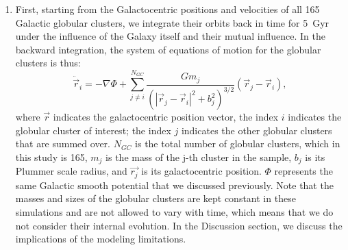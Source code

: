 \documentclass{aa}
\begin{document}
      \begin{enumerate}
          \item First, starting from the Galactocentric positions and velocities of all 165 Galactic globular clusters, we integrate their orbits back in time for 5~Gyr under the influence of the Galaxy itself and their mutual influence. In the backward integration, the system of equations of motion for the globular clusters is thus: 
          \begin{equation}
          \ddot{\vec{r}}_i = -\nabla \Phi + \left.\sum_{j\neq i}^{N_{GC}} \frac{Gm_j}{\left(|\vec{r}_j - \vec{r}_i|^2 + b_j^2\right)^{3/2}}\right. \left(\vec{r}_j - \vec{r}_i\right),
          \end{equation}\label{eq:GCNBody} 
          \noindent where $\vec{r}$ indicates the galactocentric position vector, the index $i$ indicates the globular cluster of interest; the index $j$ indicates the other globular clusters that are summed over. $N_{GC}$ is the total number of globular clusters, which in this study is 165, $m_j$ is the mass of the j-th cluster in the sample, $b_j$ is its Plummer scale radius, and $\vec{r_j}$ is its galactocentric position. $\Phi$ represents the same Galactic smooth potential that we discussed previously\citep[][Model~II, in the present case]{2017A&A...598A..66P}. Note that the masses and sizes of the globular clusters are kept constant in these simulations and are not allowed to vary with time, which means that we do not consider their internal evolution. In the Discussion section, we discuss the implications of the modeling limitations.
      

\end{enumerate}
\end{document}
